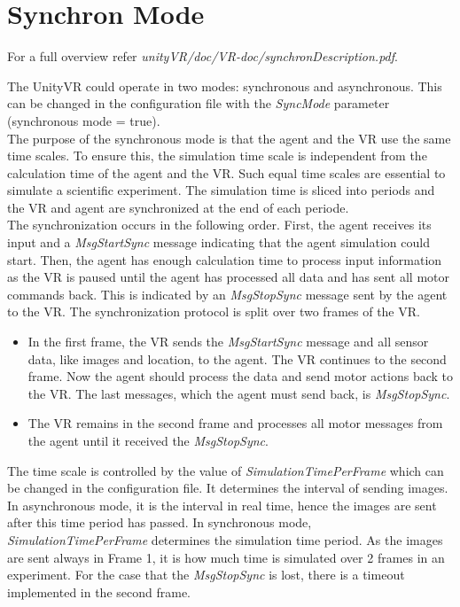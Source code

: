 \documentclass[10pt,final]{scrreprt}
\begin{document}
\section{Synchron Mode}
\label{SyncMode}

For a full overview refer \emph{unityVR/doc/VR-doc/synchronDescription.pdf}.

The UnityVR could operate in two modes: synchronous and asynchronous. This can be changed in the
configuration file with the \emph{SyncMode} parameter (synchronous mode = true).\\
The purpose of the synchronous mode is that the agent and the VR use the same time scales. To ensure this,
the simulation time scale is independent from the calculation time of the agent and the VR. Such equal time
scales are essential to simulate a scientific experiment. The simulation time is sliced into periods and the VR and agent are synchronized at the end of each periode.\\
The synchronization occurs in the following order. First, the agent receives its input and a \emph{MsgStartSync}
message indicating that the agent simulation could start. Then, the agent has enough calculation time to process
input information as the VR is paused until the agent has processed all data and has sent all motor commands
back. This is indicated by an \emph{MsgStopSync} message sent by the agent to the VR.
The synchronization protocol is split over two frames of the VR.

\begin{itemize}
\item In the first frame, the VR sends the \emph{MsgStartSync} message and all sensor data, like images and location,
to the agent. The VR continues to the second frame. Now the agent should process the data and send
motor actions back to the VR. The last messages, which the agent must send back, is \emph{MsgStopSync}.
\item The VR remains in the second frame and processes all motor messages from the agent until it received
the \emph{MsgStopSync}.
\end{itemize}

The time scale is controlled by the value of \emph{SimulationTimePerFrame} which can be changed in the configuration
file. It determines the interval of sending images. In asynchronous mode, it is the interval in real time, hence the
images are sent after this time period has passed. In synchronous mode, \emph{SimulationTimePerFrame} determines
the simulation time period. As the images are sent always in Frame 1, it is how much time is simulated over 2
frames in an experiment.
For the case that the \emph{MsgStopSync} is lost, there is a timeout implemented in the second frame.
\end{document}
